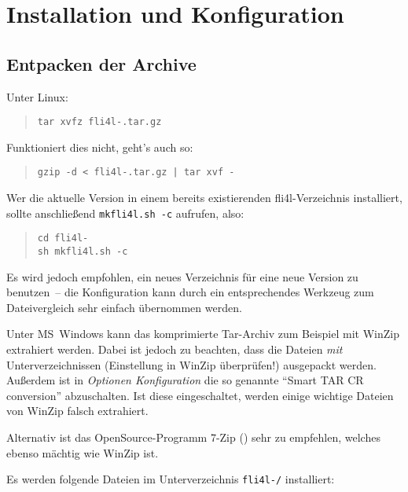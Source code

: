 \chapter{Installation und Konfiguration}

\section{Entpacken der Archive}

Unter Linux:

\begin{verse}\texttt{tar xvfz fli4l-\version.tar.gz}\end{verse}

\noindent Funktioniert dies nicht, geht's auch so:

\begin{verse}\texttt{gzip -d < fli4l-\version.tar.gz | tar xvf -}\end{verse}

Wer die aktuelle Version in einem bereits existierenden
fli4l-Verzeichnis installiert, sollte anschließend
\texttt{mkfli4l.sh -c} aufrufen, also:

\begin{verse}
    \texttt{cd fli4l-\version}\\
    \texttt{sh mkfli4l.sh -c}
\end{verse}

Es wird jedoch empfohlen, ein neues Verzeichnis für eine neue Version
zu benutzen~-- die Konfiguration kann durch ein entsprechendes Werkzeug zum
Dateivergleich sehr einfach übernommen werden.

Unter MS~Windows kann das komprimierte Tar-Archiv zum Beispiel mit WinZip
extrahiert werden. Dabei ist jedoch zu beachten, dass die Dateien
\emph{mit} Unterverzeichnissen (Einstellung in WinZip überprüfen!)
ausgepackt werden. Außerdem ist in \emph{Optionen \pfeil
  Konfiguration} die so genannte "`Smart TAR CR conversion"'
abzuschalten. Ist diese eingeschaltet, werden einige wichtige
Dateien von WinZip falsch extrahiert.

Alternativ ist das OpenSource-Programm 7-Zip ()
sehr zu empfehlen, welches ebenso mächtig wie WinZip ist.

Es werden folgende Dateien im Unterverzeichnis
\texttt{fli4l-\version/} installiert:

